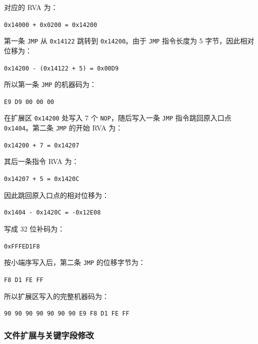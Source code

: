 ﻿\documentclass[12pt]{ctexart}
\begin{document}
对应的 RVA 为：

\begin{center}
\texttt{0x14000 + 0x0200 = 0x14200}
\end{center}

第一条 \texttt{JMP} 从 \texttt{0x14122} 跳转到 \texttt{0x14200}。由于 \texttt{JMP} 指令长度为 5 字节，因此相对位移为：

\begin{center}
\texttt{0x14200 - (0x14122 + 5) = 0x00D9}
\end{center}

所以第一条 \texttt{JMP} 的机器码为：

\begin{center}
\texttt{E9 D9 00 00 00}
\end{center}

在扩展区 \texttt{0x14200} 处写入 7 个 \texttt{NOP}，随后写入一条 \texttt{JMP} 指令跳回原入口点 \texttt{0x1404}。第二条 \texttt{JMP} 的开始 RVA 为：

\begin{center}
\texttt{0x14200 + 7 = 0x14207}
\end{center}

其后一条指令 RVA 为：

\begin{center}
\texttt{0x14207 + 5 = 0x1420C}
\end{center}

因此跳回原入口点的相对位移为：

\begin{center}
\texttt{0x1404 - 0x1420C = -0x12E08}
\end{center}

写成 32 位补码为：

\begin{center}
\texttt{0xFFFED1F8}
\end{center}

按小端序写入后，第二条 \texttt{JMP} 的位移字节为：

\begin{center}
\texttt{F8 D1 FE FF}
\end{center}

所以扩展区写入的完整机器码为：

\begin{center}
\texttt{90 90 90 90 90 90 90 E9 F8 D1 FE FF}
\end{center}

\subsubsection{文件扩展与关键字段修改}
\end{document}
